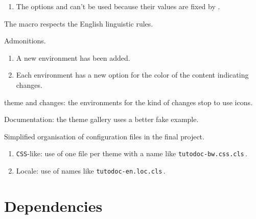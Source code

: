 {\begin{tdocnew}
\begin{enumerate}
		\item The  options  and  can't be used because their values are fixed by \thisproj.
	\end{enumerate}

	\item The macro  respects the English linguistic rules.

	\item Admonitions.
	\begin{enumerate}
		\item A new environment  has been added.

		\item Each environment has a new option  for the color of the content indicating changes.
	\end{enumerate}
\end{tdocnew}


\begin{tdocupdate}
	\item {} theme and changes: the environments for the kind of changes stop to use icons.

	\item Documentation: the theme gallery uses a better fake example.
\end{tdocupdate}



\begin{tdoctech}
	\item Simplified organisation of configuration files in the final project.
	\begin{enumerate}
		\item \texttt{CSS}-like: use of one file per theme with a name like \texttt{tutodoc-bw.css.cls}\,.

		\item Locale: use of names like \texttt{tutodoc-en.loc.cls}\,.
	\end{enumerate}
\end{tdoctech}
}


\newpage
\tableofcontents
\newpage


\section{Dependencies}

